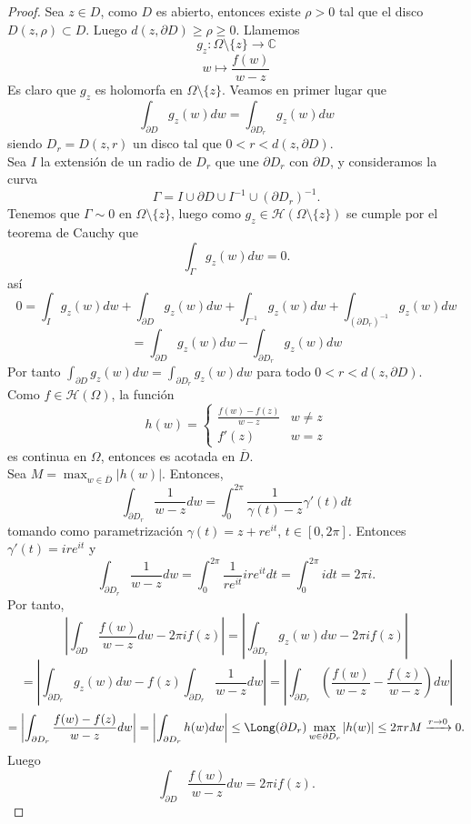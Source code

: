 \begin{proof}
    Sea $z \in D$, como $D$ es abierto, entonces existe $\rho > 0$ tal que el disco $D(z, \rho) \subset D$. Luego $d (z, \partial D) \geq \rho \geq 0$. Llamemos
    \[
        g_z : \Omega \setminus \{ z \} \to \mathbb{C}
    \]
    \[
        w \mapsto \frac{f(w)}{w - z}
    \]
    Es claro que $g_z$ es holomorfa en $\Omega \setminus \{ z \}$. Veamos en primer lugar que 
    \[
        \int_{\partial D} g_z(w) dw = \int_{\partial D_r} g_z(w) dw
    \]
    siendo $D_r = D(z, r)$ un disco tal que $0 < r < d(z, \partial D)$.\\
    Sea $I$ la extensión de un radio de $D_r$ que une $\partial D_r$ con $\partial D$, y consideramos la curva
    \[
        \Gamma = I \cup \partial D \cup I^{-1} \cup (\partial D_r)^{-1}.
    \]
    Tenemos que $\Gamma \sim 0$ en $\Omega \setminus \{ z \}$, luego como $g_z \in \mathcal{H}(\Omega \setminus \{ z \})$ se cumple por el teorema de Cauchy que
    \[
        \int_{\Gamma} g_z(w) dw = 0.
    \]
    así
    \[
        0 = \int_{I} g_z(w) dw + \int_{\partial D} g_z(w) dw + \int_{I^{-1}} g_z(w) dw + \int_{(\partial D_r)^{-1}} g_z(w) dw
    \]
    \[
        = \int_{\partial D} g_z(w) dw - \int_{\partial D_r} g_z(w) dw
    \]
    Por tanto $\int_{\partial D} g_z(w) dw = \int_{\partial D_r} g_z(w) dw$ para todo $0 < r < d(z, \partial D)$.\\
    Como $f \in \mathcal{H}(\Omega)$, la función
    \[
        h(w) = \begin{cases}
            \frac{f(w) - f(z)}{w - z} & w \neq z \\
            f'(z) & w = z
        \end{cases}
    \]
    es continua en $\Omega$, entonces es acotada en $\overline{D}$.\\
    Sea $M = \max_{w \in \overline{D}} |h(w)|$. Entonces, 
    \[
        \int_{\partial D_r} \frac{1}{w - z} dw = \int_{0}^{2 \pi} \frac{1}{\gamma(t) - z} \gamma'(t) dt
    \]
    tomando como parametrización $\gamma (t) = z + r e^{i t}$, $t \in [0, 2 \pi]$. Entonces $\gamma'(t) = i r e^{i t}$ y
    \[
        \int_{\partial D_r} \frac{1}{w - z} dw = \int_{0}^{2 \pi} \frac{1}{r e^{i t}} i r e^{i t} dt = \int_{0}^{2 \pi} i dt = 2 \pi i.
    \]
    Por tanto,
    \[
        \left| \int_{\partial D} \frac{f(w)}{w - z} dw - 2 \pi i f(z) \right| = \left| \int_{\partial D_r} g_z(w) dw - 2 \pi i f(z) \right|
    \]
    \[
        = \left| \int_{\partial D_r} g_z(w) dw - f(z) \int_{\partial D_r} \frac{1}{w - z} dw \right| = \left| \int_{\partial D_r} \left( \frac{f(w)}{w - z} - \frac{f(z)}{w - z} \right) dw \right|
    \]
    \[
        = \left| \int_{\partial D_r} \frac{f(w) - f(z)}{w - z} dw \right| = \left| \int_{\partial D_r} h(w) dw \right| \leq \Long(\partial D_r) \max_{w \in \partial D_r} |h(w)| \leq 2 \pi r M \xrightarrow{r \to 0} 0.
    \]
    Luego 
    \[
        \int_{\partial D} \frac{f(w)}{w - z} dw = 2 \pi i f(z).
    \]
\end{proof}


